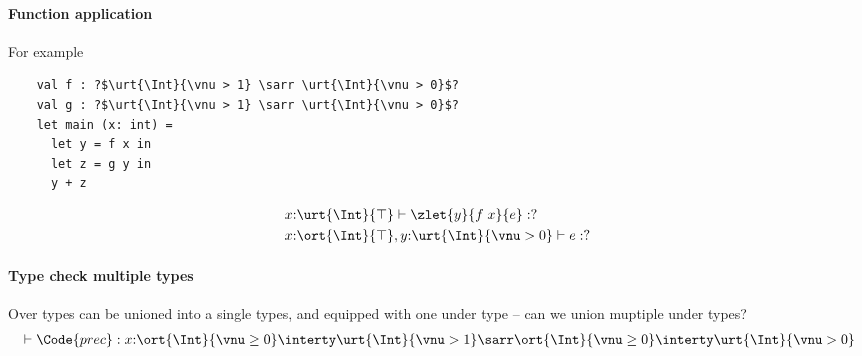 \paragraph{Function application} For example
\begin{verbatim}
    val f : ?$\urt{\Int}{\vnu > 1} \sarr \urt{\Int}{\vnu > 0}$?
    val g : ?$\urt{\Int}{\vnu > 1} \sarr \urt{\Int}{\vnu > 0}$?
    let main (x: int) =
      let y = f x in
      let z = g y in
      y + z
\end{verbatim}
\begin{align*}
    &x{:}\urt{\Int}{\top} \vdash \zlet{y}{f\;x}{e} : ? \\
    &x{:}\ort{\Int}{\top}, y{:}\urt{\Int}{\vnu > 0} \vdash e : ? \\
\end{align*}\noindent

\paragraph{Type check multiple types} Over types can be unioned into a single types, and equipped with one under type -- can we union muptiple under types?
\begin{align*}
    &\vdash \Code{prec} : x{:}\ort{\Int}{\vnu \geq 0} \interty \urt{\Int}{\vnu > 1} \sarr \ort{\Int}{\vnu \geq 0} \interty \urt{\Int}{\vnu > 0} \\
\end{align*}\noindent